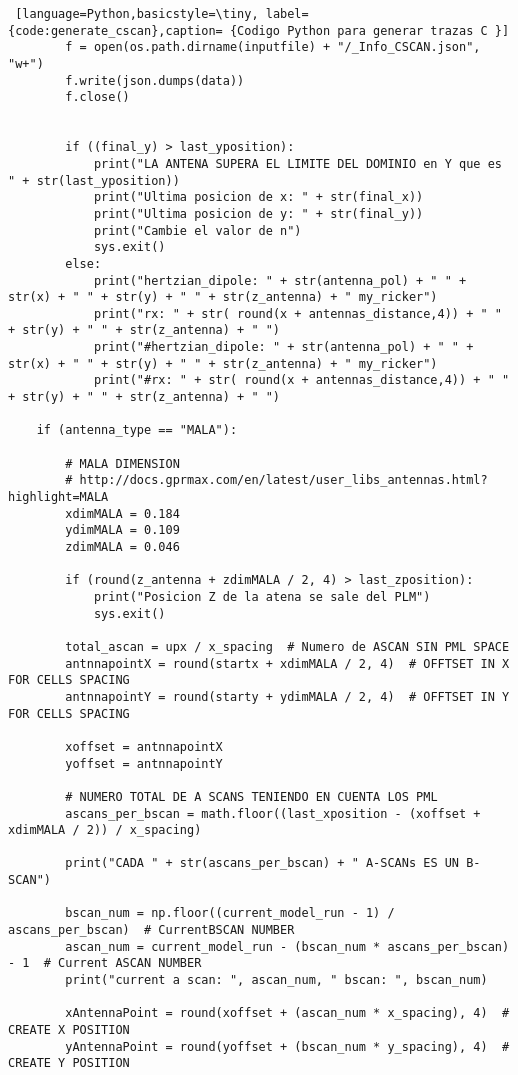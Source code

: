 \begin{lstlisting} [language=Python,basicstyle=\tiny, label={code:generate_cscan},caption= {Codigo Python para generar trazas C }]
        f = open(os.path.dirname(inputfile) + "/_Info_CSCAN.json", "w+")
        f.write(json.dumps(data))
        f.close()


        if ((final_y) > last_yposition):
            print("LA ANTENA SUPERA EL LIMITE DEL DOMINIO en Y que es " + str(last_yposition))
            print("Ultima posicion de x: " + str(final_x))
            print("Ultima posicion de y: " + str(final_y))
            print("Cambie el valor de n")
            sys.exit()
        else:
            print("hertzian_dipole: " + str(antenna_pol) + " " + str(x) + " " + str(y) + " " + str(z_antenna) + " my_ricker")
            print("rx: " + str( round(x + antennas_distance,4)) + " " + str(y) + " " + str(z_antenna) + " ")
            print("#hertzian_dipole: " + str(antenna_pol) + " " + str(x) + " " + str(y) + " " + str(z_antenna) + " my_ricker")
            print("#rx: " + str( round(x + antennas_distance,4)) + " " + str(y) + " " + str(z_antenna) + " ")

    if (antenna_type == "MALA"):

        # MALA DIMENSION
        # http://docs.gprmax.com/en/latest/user_libs_antennas.html?highlight=MALA
        xdimMALA = 0.184
        ydimMALA = 0.109
        zdimMALA = 0.046

        if (round(z_antenna + zdimMALA / 2, 4) > last_zposition):
            print("Posicion Z de la atena se sale del PLM")
            sys.exit()

        total_ascan = upx / x_spacing  # Numero de ASCAN SIN PML SPACE
        antnnapointX = round(startx + xdimMALA / 2, 4)  # OFFTSET IN X FOR CELLS SPACING
        antnnapointY = round(starty + ydimMALA / 2, 4)  # OFFTSET IN Y FOR CELLS SPACING

        xoffset = antnnapointX
        yoffset = antnnapointY

        # NUMERO TOTAL DE A SCANS TENIENDO EN CUENTA LOS PML
        ascans_per_bscan = math.floor((last_xposition - (xoffset + xdimMALA / 2)) / x_spacing)

        print("CADA " + str(ascans_per_bscan) + " A-SCANs ES UN B-SCAN")

        bscan_num = np.floor((current_model_run - 1) / ascans_per_bscan)  # CurrentBSCAN NUMBER
        ascan_num = current_model_run - (bscan_num * ascans_per_bscan) - 1  # Current ASCAN NUMBER
        print("current a scan: ", ascan_num, " bscan: ", bscan_num)

        xAntennaPoint = round(xoffset + (ascan_num * x_spacing), 4)  # CREATE X POSITION
        yAntennaPoint = round(yoffset + (bscan_num * y_spacing), 4)  # CREATE Y POSITION


\end{lstlisting}
